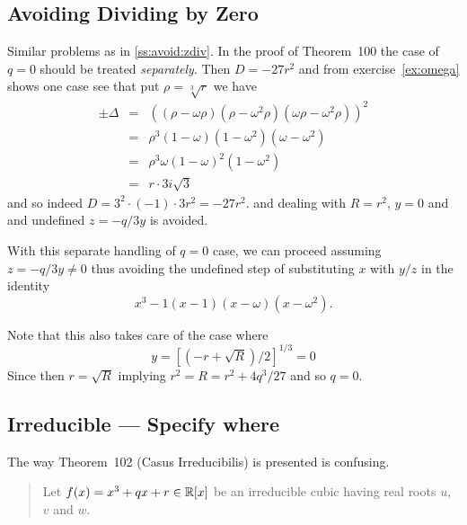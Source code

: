\subsection{Avoiding Dividing by Zero}  \label{ss:avoid:zdiv2}

Similar problems as in \ref{ss:avoid:zdiv}. In the proof of Theorem~100
the case of \(q=0\) should be treated \emph{separately}. Then
\(D=-27r^2\) and from exercise~\ref{ex:omega} shows
one case see that put \(\rho = \sqrt[3]{r}\) we have
\begin{eqnarray*}
 \pm\Delta
  & = & \left((\rho - \omega\rho)(\rho - \omega^2\rho)(\omega\rho
                                                    - \omega^2\rho)\right)^2 \\
  & = & \rho^3(1 - \omega)(1 - \omega^2)(\omega - \omega^2) \\
  & = & \rho^3\omega(1 - \omega)^2(1 - \omega^2) \\
  & = & r\cdot 3i\sqrt{3}
\end{eqnarray*}
and so indeed \(D = 3^2\cdot(-1)\cdot 3 r^2 = -27r^2\).
and dealing with \(R=r^2\), \(y=0\) and and undefined \(z=-q/3y\) is avoided.

With this separate handling of \(q=0\) case, we can proceed assuming
\(z=-q/3y\neq 0\) thus avoiding the undefined step
of substituting $x$ with \(y/z\) in the identity
\begin{equation*}
 x^3 - 1 (x - 1)(x - \omega)(x - \omega^2).
\end{equation*}

Note that this also takes care of the case where
\begin{equation*}
y = \left[(-r+\sqrt{R})/2\right]^{1/3} = 0
\end{equation*}
Since then \(r=\sqrt{R}\) implying \(r^2 = R = r^2 + 4q^3/27\) and
so \(q=0\).


\subsection{Irreducible --- Specify where}

The way Theorem~102 (Casus Irreducibilis) is presented
is confusing.
\begin{quotation}
  \setcounter{quotethm}{101} %
  \begin{quotethm}
   Let \(f(x) = x^3+qx+r\in \mathbb{R}[x]\) be an irreducible cubic having real
   roots $u$, $v$ and $w$. \mldots
  \end{quotethm}
\end{quotation}

